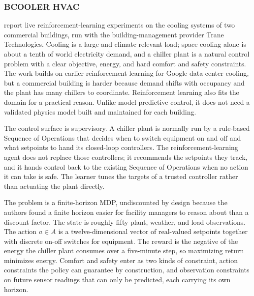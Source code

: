 \subsubsection{BCOOLER HVAC}
\citet{Luo2022BCOOLER} report live reinforcement-learning experiments on the cooling systems of two commercial buildings, run with the building-management provider Trane Technologies. Cooling is a large and climate-relevant load; space cooling alone is about a tenth of world electricity demand, and a chiller plant is a natural control problem with a clear objective, energy, and hard comfort and safety constraints. The work builds on earlier reinforcement learning for Google data-center cooling, but a commercial building is harder because demand shifts with occupancy and the plant has many chillers to coordinate. Reinforcement learning also fits the domain for a practical reason. Unlike model predictive control, it does not need a validated physics model built and maintained for each building.

The control surface is supervisory. A chiller plant is normally run by a rule-based Sequence of Operations that decides when to switch equipment on and off and what setpoints to hand its closed-loop controllers. The reinforcement-learning agent does not replace those controllers; it recommends the setpoints they track, and it hands control back to the existing Sequence of Operations when no action it can take is safe. The learner tunes the targets of a trusted controller rather than actuating the plant directly.

The problem is a finite-horizon MDP, undiscounted by design because the authors found a finite horizon easier for facility managers to reason about than a discount factor. The state is roughly fifty plant, weather, and load observations. The action $a\in A$ is a twelve-dimensional vector of real-valued setpoints together with discrete on-off switches for equipment. The reward is the negative of the energy the chiller plant consumes over a five-minute step, so maximizing return minimizes energy. Comfort and safety enter as two kinds of constraint, action constraints the policy can guarantee by construction, and observation constraints on future sensor readings that can only be predicted, each carrying its own horizon.

